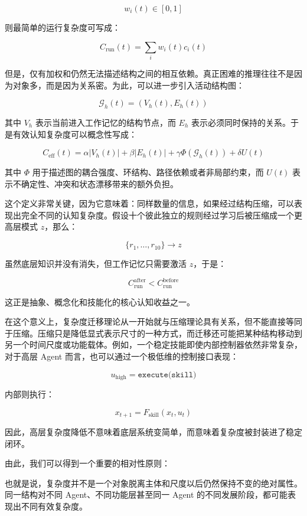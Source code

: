 \[
w_i(t)\in[0,1]
\]

则最简单的运行复杂度可写成：

\[
C_{\mathrm{run}}(t)
=
\sum_i w_i(t)c_i(t)
\]

但是，仅有加权和仍然无法描述结构之间的相互依赖。真正困难的推理往往不是因为对象多，而是因为关系密。为此，可以进一步引入活动结构图：

\[
\mathcal{G}_h(t)
=
\left(
V_h(t),E_h(t)
\right)
\]

其中 $V_h$ 表示当前进入工作记忆的结构节点，而 $E_h$ 表示必须同时保持的关系。于是有效认知复杂度可以概念性写成：

\[
C_{\mathrm{eff}}(t)
=
\alpha |V_h(t)|
+
\beta |E_h(t)|
+
\gamma \Phi(\mathcal{G}_h(t))
+
\delta U(t)
\]

其中 $\Phi$ 用于描述图的耦合强度、环结构、路径依赖或者非局部约束，而 $U(t)$ 表示不确定性、冲突和状态漂移带来的额外负担。

这个定义非常关键，因为它意味着：同样数量的信息，如果经过结构压缩，可以表现出完全不同的认知复杂度。假设十个彼此独立的规则经过学习后被压缩成一个更高层模式 $z$，那么：

\[
\{r_1,\ldots,r_{10}\}
\rightarrow
z
\]

虽然底层知识并没有消失，但工作记忆只需要激活 $z$，于是：

\[
C_{\mathrm{run}}^{\mathrm{after}}
<
C_{\mathrm{run}}^{\mathrm{before}}
\]

这正是抽象、概念化和技能化的核心认知收益之一。

在这个意义上，复杂度迁移理论从一开始就与压缩理论具有关系，但不能直接等同于压缩。压缩只是降低显式表示尺寸的一种方式，而迁移还可能把某种结构移动到另一个时间尺度或功能载体。例如，一个稳定技能即使内部控制器依然非常复杂，对于高层 Agent 而言，也可以通过一个极低维的控制接口表现：

\[
u_{\mathrm{high}}
=
\texttt{execute(skill)}
\]

内部则执行：

\[
x_{t+1}
=
F_{\mathrm{skill}}(x_t,u_t)
\]

因此，高层复杂度降低不意味着底层系统变简单，而意味着复杂度被封装进了稳定闭环。

由此，我们可以得到一个重要的相对性原则：

\begin{statementbox}
\centering
{}
\end{statementbox}

也就是说，复杂度并不是一个对象脱离主体和尺度以后仍然保持不变的绝对属性。同一结构对不同 Agent、不同功能层甚至同一 Agent 的不同发展阶段，都可能表现出不同有效复杂度。

